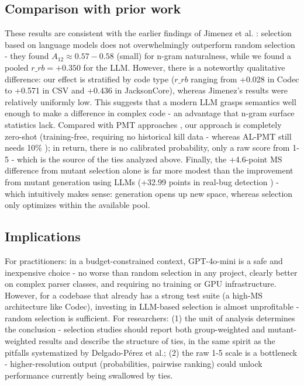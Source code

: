 \subsection{Comparison with prior work}
These results are consistent with the earlier findings of Jimenez et al. \cite{jimenez2018naturalness}: selection based on language models does not overwhelmingly outperform random selection - they found $A_{12} \approx 0.57-0.58$ (small) for n-gram naturalness, while we found a pooled $r\_rb=+0.350$ for the LLM. However, there is a noteworthy qualitative difference: our effect is stratified by code type ($r\_rb$ ranging from +0.028 in Codec to +0.571 in CSV and +0.436 in JacksonCore), whereas Jimenez's results were relatively uniformly low. This suggests that a modern LLM grasps semantics well enough to make a difference in complex code - an advantage that n-gram surface statistics lack. Compared with PMT approaches \cite{kim2022seshat, jain2023mutationbert, zhao2024soda}, our approach is completely zero-shot (training-free, requiring no historical kill data - whereas AL-PMT still needs 10\% \cite{borsi2025alpmt}); in return, there is no calibrated probability, only a raw score from 1-5 - which is the source of the ties analyzed above. Finally, the +4.6-point MS difference from mutant selection alone is far more modest than the improvement from mutant generation using LLMs (+32.99 points in real-bug detection \cite{wang2025comprehensive}) - which intuitively makes sense: generation opens up new space, whereas selection only optimizes within the available pool.
\subsection{Implications}
For practitioners: in a budget-constrained context, GPT-4o-mini is a safe and inexpensive choice - no worse than random selection in any project, clearly better on complex parser classes, and requiring no training or GPU infrastructure. However, for a codebase that already has a strong test suite (a high-MS architecture like Codec), investing in LLM-based selection is almost unprofitable - random selection is sufficient. For researchers: (1) the unit of analysis determines the conclusion - selection studies should report both group-weighted and mutant-weighted results and describe the structure of ties, in the same spirit as the pitfalls systematized by Delgado-Pérez et al.; (2) the raw 1-5 scale is a bottleneck - higher-resolution output (probabilities, pairwise ranking) could unlock performance currently being swallowed by ties.